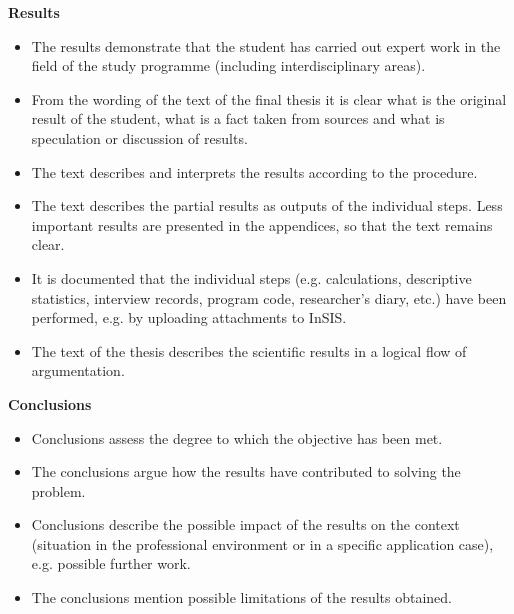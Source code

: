 {\bfseries\sffamily\Large Results}
\begin{itemize}
\item \vspace*{-2ex}The results demonstrate that the student has carried out expert work in the field of the study programme (including interdisciplinary areas).
\item From the wording of the text of the final thesis it is clear what is the original result of the student, what is a fact taken from sources and what is speculation or discussion of results.
\item The text describes and interprets the results according to the procedure.
\item The text describes the partial results as outputs of the individual steps. Less important results are presented in the appendices, so that the text remains clear.
\item It is documented that the individual steps (e.g. calculations, descriptive statistics, interview records, program code, researcher's diary, etc.) have been performed, e.g. by uploading attachments to InSIS.
\item The text of the thesis describes the scientific results in a logical flow of argumentation. 
\end{itemize}

{\bfseries\sffamily\Large Conclusions}
\begin{itemize}
\item \vspace*{-2ex}Conclusions assess the degree to which the objective has been met.
\item The conclusions argue how the results have contributed to solving the problem.
\item Conclusions describe the possible impact of the results on the context (situation in the professional environment or in a specific application case), e.g. possible further work.
\item The conclusions mention possible limitations of the results obtained.
\end{itemize}

